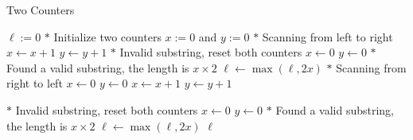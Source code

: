 \begin{algorithm}[H]
\caption{Two Counters}
\begin{algorithmic}[1]
\State $\ell := 0$
\State $\ast$ Initialize two counters $x :=0$ and $y := 0$ 
\State $\ast$ Scanning from left to right
\State $x \gets x+1$
\Else
\State $y \gets y+1$
\EndIf
{}
\State $\ast$ Invalid substring, reset both counters
\State $x \gets 0$
\State $y\gets 0$
\State $\ast$ Found a valid substring, the length is $x\times 2$
\State $\ell \gets \max(\ell, 2x)$
\EndIf
\EndFor
\State $\ast$ Scanning from right to left
\State $x\gets 0$
\State $y\gets 0$
\State $x \gets x+1$
\Else
\State $y \gets y+1$
\EndIf
{}
\end{algorithmic}
\end{algorithm}
\begin{algorithm}[H]
\begin{algorithmic}[1]
\State $\ast$ Invalid substring, reset both counters
\State $x \gets 0$
\State $y\gets 0$
\State $\ast$ Found a valid substring, the length is $x\times 2$
\State $\ell \gets \max(\ell, 2x)$
\EndIf
\EndFor
\State \Return $\ell$
\EndProcedure
\end{algorithmic}
\end{algorithm}

